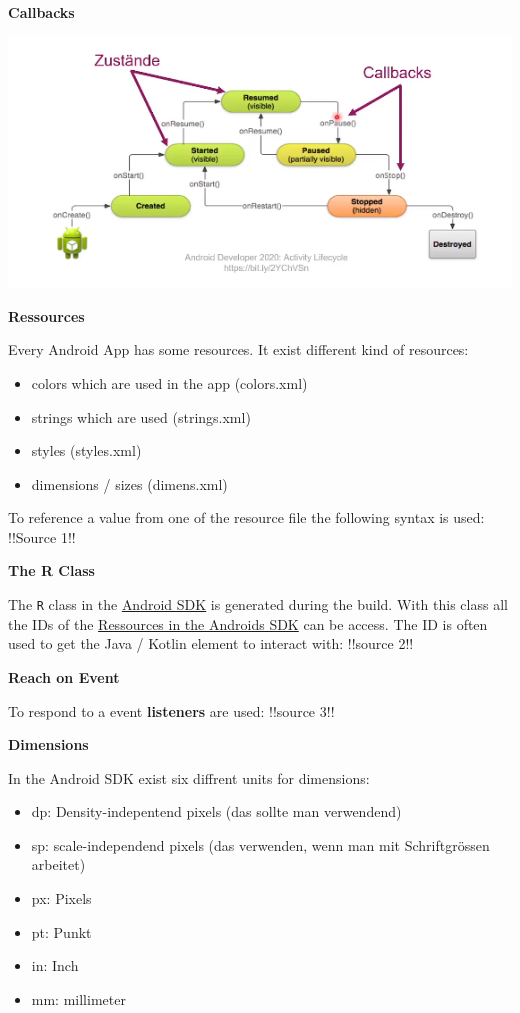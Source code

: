 \documentclass[11pt,twoside,landscape]{article}
\begin{document}
\begin{multicols}{3}
\textbf{Callbacks}

\begin{center}
\includegraphics[width=.9\linewidth]{img/android_callbacks.png}
\end{center}


\textbf{Ressources}

Every Android App has some resources. It exist different kind of resources:
\begin{itemize}
\item colors which are used in the app (colors.xml)
\item strings which are used (strings.xml)
\item styles (styles.xml)
\item dimensions / sizes (dimens.xml)
\end{itemize}


To reference a value from one of the resource file the following syntax is used:
!!Source 1!!


\textbf{The R Class}

The \texttt{R} class in the \href{../../../roam/20210928175951-android_sdk.org}{Android SDK} is generated during the build.
With this class all the IDs of the \href{../../../roam/20210928180142-ressources_in_the_androids_sdk.org}{Ressources in the Androids SDK} can be access.
The ID is often used to get the Java / Kotlin element to interact with:
!!source 2!!

\textbf{Reach on Event}

To respond to a event \textbf{listeners} are used:
!!source 3!!

\textbf{Dimensions}

In the Android SDK exist six diffrent units for dimensions:
\begin{itemize}
\item dp: Density-indepentend pixels (das sollte man verwendend)
\item sp: scale-independend pixels (das verwenden, wenn man mit Schriftgrössen arbeitet)
\item px: Pixels
\item pt: Punkt
\item in: Inch
\item mm: millimeter
\end{itemize}



\end{multicols}
\end{document}
